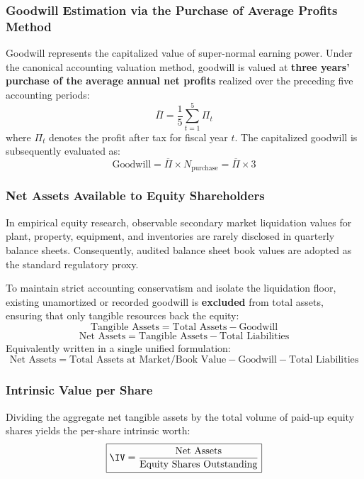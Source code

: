 \subsubsection{Goodwill Estimation via the Purchase of Average Profits Method}
Goodwill represents the capitalized value of super-normal earning power. Under the canonical accounting valuation method, goodwill is valued at \textbf{three years' purchase of the average annual net profits} realized over the preceding five accounting periods:
\begin{equation}
    \overline{\Pi} = \frac{1}{5} \sum_{t=1}^{5} \Pi_t
\end{equation}
where $\Pi_t$ denotes the profit after tax for fiscal year $t$. The capitalized goodwill is subsequently evaluated as:
\begin{equation}
    \text{Goodwill} = \overline{\Pi} \times N_{\text{purchase}} = \overline{\Pi} \times 3
\end{equation}

\subsubsection{Net Assets Available to Equity Shareholders}
In empirical equity research, observable secondary market liquidation values for plant, property, equipment, and inventories are rarely disclosed in quarterly balance sheets. Consequently, audited balance sheet book values are adopted as the standard regulatory proxy. 

To maintain strict accounting conservatism and isolate the liquidation floor, existing unamortized or recorded goodwill is \textbf{excluded} from total assets, ensuring that only tangible resources back the equity:
\begin{equation}
    \text{Tangible Assets} = \text{Total Assets} - \text{Goodwill}
\end{equation}
\begin{equation}
    \text{Net Assets} = \text{Tangible Assets} - \text{Total Liabilities}
\end{equation}
Equivalently written in a single unified formulation:
\begin{equation}
    \text{Net Assets} = \text{Total Assets at Market/Book Value} - \text{Goodwill} - \text{Total Liabilities}
\end{equation}

\subsubsection{Intrinsic Value per Share}
Dividing the aggregate net tangible assets by the total volume of paid-up equity shares yields the per-share intrinsic worth:
\begin{equation}
    \boxed{\IV = \frac{\text{Net Assets}}{\text{Equity Shares Outstanding}}}
\end{equation}

